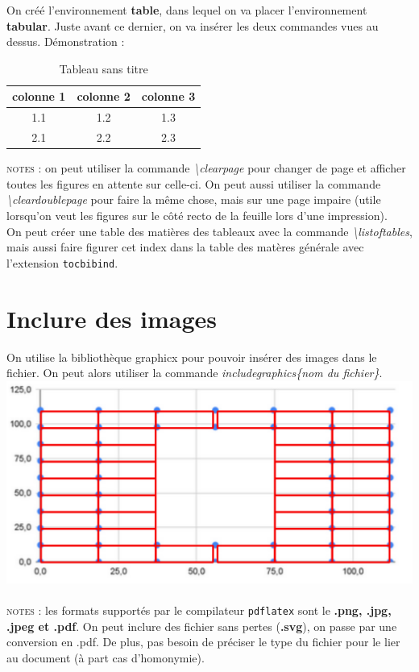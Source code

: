 \documentclass[a4paper, 10pt]{book}
\begin{document}
\pagebreak

On créé l'environnement \textbf{table}, dans lequel on va placer l'environnement \textbf{tabular}. Juste avant ce dernier, on va insérer les deux commandes vues au dessus. Démonstration :

\begin{table}[h]
\caption{\label{} Tableau sans titre}
\centering 
\begin{tabular}{|c|c|c|}
\\ 
\hline colonne 1 & colonne 2 & colonne 3 \\
\hline 1.1 & 1.2 & 1.3 \\
\hline 2.1 & 2.2 & 2.3 \\
\hline
\end{tabular}
\end{table}


\textsc{notes :} on peut utiliser la commande \textit{\textbackslash clearpage} pour changer de page et afficher toutes les figures en attente sur celle-ci. On peut aussi utiliser la commande \textit{\textbackslash cleardoublepage} pour faire la même chose, mais sur une page impaire (utile lorsqu'on veut les figures sur le côté recto de la feuille lors d'une impression). \\
On peut créer une table des matières des tableaux avec la commande \textit{\textbackslash listoftables}, mais aussi faire figurer cet index dans la table des matères générale avec l'extension \texttt{tocbibind}.

\listoftables

\chapter{Inclure des images}
On utilise la bibliothèque \textsf{graphicx} pour pouvoir insérer des images dans le fichier. On peut alors utiliser la commande \textit{includegraphics\{nom du fichier\}}.\\
\includegraphics{grapheHV}\\ \\
\textsc{notes :} les formats supportés par le compilateur \texttt{pdflatex} sont le \textbf{.png, .jpg, .jpeg et .pdf}. On peut inclure des fichier sans pertes (\textbf{.svg}), on passe par une conversion en .pdf. De plus, pas besoin de préciser le type du fichier pour le lier au document (à part cas d'homonymie).
\end{document}
